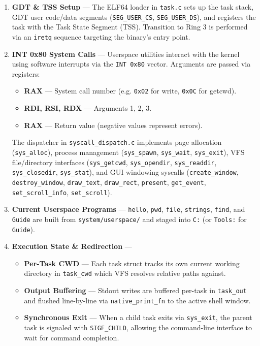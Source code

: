\documentclass[11pt,a4paper]{report}
\begin{document}
\begin{enumerate}
    \item \textbf{GDT \& TSS Setup} --- The ELF64 loader in \texttt{task.c} sets up the task stack, GDT user code/data segments (\texttt{SEG\_USER\_CS}, \texttt{SEG\_USER\_DS}), and registers the task with the Task State Segment (TSS). Transition to Ring 3 is performed via an \texttt{iretq} sequence targeting the binary's entry point.
    \item \textbf{INT 0x80 System Calls} --- Userspace utilities interact with the kernel using software interrupts via the \texttt{INT 0x80} vector. Arguments are passed via registers:
          \begin{itemize}
              \item \textbf{RAX} --- System call number (e.g. \texttt{0x02} for write, \texttt{0x0C} for getcwd).
              \item \textbf{RDI, RSI, RDX} --- Arguments 1, 2, 3.
              \item \textbf{RAX} --- Return value (negative values represent errors).
          \end{itemize}
          The dispatcher in \texttt{syscall\_dispatch.c} implements page allocation (\texttt{sys\_alloc}), process management (\texttt{sys\_spawn}, \texttt{sys\_wait}, \texttt{sys\_exit}), VFS file/directory interfaces (\texttt{sys\_getcwd}, \texttt{sys\_opendir}, \texttt{sys\_readdir}, \texttt{sys\_closedir}, \texttt{sys\_stat}), and GUI windowing syscalls (\texttt{create\_window}, \texttt{destroy\_window}, \texttt{draw\_text}, \texttt{draw\_rect}, \texttt{present}, \texttt{get\_event}, \texttt{set\_scroll\_info}, \texttt{set\_scroll}).
    \item \textbf{Current Userspace Programs} --- \texttt{hello}, \texttt{pwd}, \texttt{file}, \texttt{strings}, \texttt{find}, and \texttt{Guide} are built from \texttt{system/userspace/} and staged into \texttt{C:} (or \texttt{Tools:} for \texttt{Guide}).
    \item \textbf{Execution State \& Redirection} ---
          \begin{itemize}
              \item \textbf{Per-Task CWD} --- Each task struct tracks its own current working directory in \texttt{task\_cwd} which VFS resolves relative paths against.
              \item \textbf{Output Buffering} --- Stdout writes are buffered per-task in \texttt{task\_out} and flushed line-by-line via \texttt{native\_print\_fn} to the active shell window.
              \item \textbf{Synchronous Exit} --- When a child task exits via \texttt{sys\_exit}, the parent task is signaled with \texttt{SIGF\_CHILD}, allowing the command-line interface to wait for command completion.
          \end{itemize}
\end{enumerate}
\end{document}
